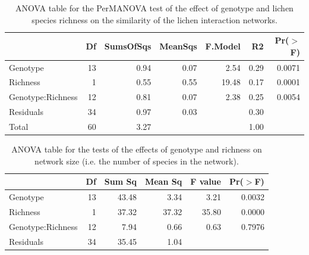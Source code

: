 \documentclass[11pt]{amsart}
\begin{document}
\pagebreak

\begin{center} 
\begin{table}[ht]
\begin{center}
\begin{tabular}{lrrrrrr}
  \hline
 & Df & SumsOfSqs & MeanSqs & F.Model & R2 & Pr($>$F) \\ 
  \hline
Genotype & 13 & 0.94 & 0.07 & 2.54 & 0.29 & 0.0071 \\ 
  Richness & 1 & 0.55 & 0.55 & 19.48 & 0.17 & 0.0001 \\ 
  Genotype:Richness & 12 & 0.81 & 0.07 & 2.38 & 0.25 & 0.0054 \\ 
  Residuals & 34 & 0.97 & 0.03 &  & 0.30 &  \\ 
  Total & 60 & 3.27 &  &  & 1.00 &  \\ 
   \hline
\end{tabular}
\caption{ANOVA table for the PerMANOVA test of the effect of genotype and lichen species richness on the similarity of the lichen interaction networks.}
\end{center}
\end{table}\end{center} 

\pagebreak

\begin{center} 
\begin{table}[ht]
\begin{center}
\begin{tabular}{lrrrrr}
  \hline
 & Df & Sum Sq & Mean Sq & F value & Pr($>$F) \\ 
  \hline
Genotype          & 13 & 43.48 & 3.34 & 3.21 & 0.0032 \\ 
  Richness          & 1 & 37.32 & 37.32 & 35.80 & 0.0000 \\ 
  Genotype:Richness & 12 & 7.94 & 0.66 & 0.63 & 0.7976 \\ 
  Residuals         & 34 & 35.45 & 1.04 &  &  \\ 
   \hline
\end{tabular}
\caption{ANOVA table for the tests of the effects of genotype and richness on network size (i.e. the number of species in the network).}
\end{center}
\end{table}\end{center} 
\end{document}
